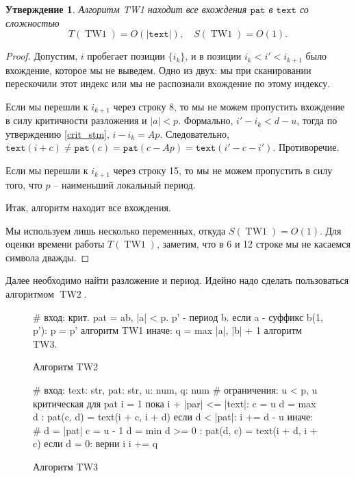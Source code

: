 \documentclass[10pt]{book}
\theoremstyle{plain}
\newtheorem{stm}{Утверждение}[section]
\newcommand{\textm}{\texttt{text}}
\newcommand{\patm}{\texttt{pat}}
\newcommand{\algm}[1]{\operatorname{#1}}
\newenvironment{figurem}[1][]
  {\begin{figure}[p]
  \caption{#1}
  \centering
  }
  {
  \end{figure}
  }
\begin{document}
\begin{stm}
  \label{TW1_corr}
  Алгоритм TW1 находит все вхождения $\patm$ в $\textm$ со сложностью
  $$T(\algm{TW1}) = O(|\textm|), \quad S(\algm{TW1}) = O(1).$$
\end{stm}
\begin{proof}
  Допустим, $i$ пробегает позиции $\{i_k\}$, и в позиции $i_k < i' < i_{k+1}$
  было вхождение, которое мы не выведем. Одно из двух: мы при сканировании
  перескочили этот индекс или мы не распознали вхождение по этому индексу.

  Если мы перешли к $i_{k + 1}$ через строку 8, то мы не можем пропустить
  вхождение в силу критичности разложения и $|a| < p$. Формально,
  $i' - i_k < d - u$, тогда по утверждению \ref{crit_stm}, $i - i_k = Ap$.
  Следовательно, 
  $\textm(i + c) \ne \patm(c) = \patm(c - Ap) = \textm(i' - c - i')$.
  Противоречие.

  Если мы перешли к $i_{k+1}$ через строку 15, то мы не можем пропустить в
  силу того, что $p$ -- наименьший локальный период.

  Итак, алгоритм находит все вхождения.
  
  Мы используем лишь несколько переменных, откуда $S(\algm{TW1}) = O(1)$.
  Для оценки времени работы $T(\algm{TW1})$, заметим, что в 6 и 12 строке мы
  не касаемся символа дважды.
\end{proof}

Далее необходимо найти разложение и период. Идейно надо сделать пользоваться
алгоритмом $\algm{TW2}$.

\begin{figurem}[Алгоритм TW2]
\begin{verbm}
  # вход: крит. pat = ab, |a| < p. p' - период b.
  если a - суффикс b(1, p'):
    p = p'
    алгоритм TW1
  иначе:
    q = max {|a|, |b|} + 1
    алгоритм TW3.
\end{verbm}
\end{figurem}

\begin{figurem}[Алгоритм TW3]
\begin{verbm}
  # вход: text: str, pat: str, u: num, q: num 
  # ограничения: u < p, u критическая для pat
  i = 1
  пока i + |par| <= |text|:
    c = u
    d = max { d : pat(c, d) = text(i + c, i + d) }
    если d < |pat|:
      i += d - u
    иначе:  # d = |pat|
      c = u - 1
      d = min { d >= 0 : pat(d, c) = text(i + d, i + c) }
      если d = 0:
        верни i
      i += q
\end{verbm}
\end{figurem}
\end{document}
